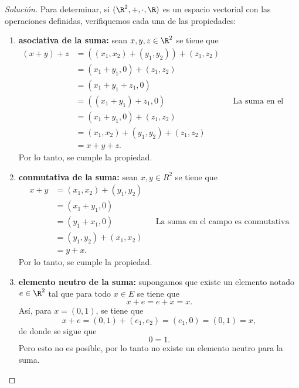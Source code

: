 \documentclass[a4,11pt]{aleph-notas}
\begin{document}
\begin{proof}[Solución]\hspace{0pt}
    Para determinar, si $(\R^2,+,\cdot,\R)$ es un espacio vectorial con las operaciones definidas, verifiquemos cada una de las propiedades:
    \begin{enumerate}
    \item \textbf{asociativa de la suma:}
        sean $x,y,z\in \R^2$ se tiene que
        \begin{align*}
             (x + y) + z & = ( (x_1,x_2)+(y_1,y_2)) + (z_1,z_2) \\
             & = (x_1+y_1,0) + (z_1,z_2) \\
             & = (x_1+y_1+z_1,0) \\
             & = ((x_1+y_1)+z_1,0) && \mbox{La suma en el campo es asociativa} \\
             & = (x_1+y_1,0) + (z_1,z_2) \\
             & = (x_1,x_2) + (y_1,y_2) + (z_1,z_2) \\
             & = x+y+z.
        \end{align*}
        Por lo tanto, se cumple la propiedad. 
    \item \textbf{conmutativa de la suma:}
        sean $x,y\in R^2$ se tiene que
        \begin{align*}
            x + y & = (x_1,x_2) + (y_1,y_2) \\
                & = (x_1 + y_1, 0 ) \\
                & = (y_1 + x_1, 0)  && \mbox{La suma en el campo es conmutativa}\\
                & = (y_1,y_2) + (x_1,x_2) \\
                & = y + x.
        \end{align*}
        Por lo tanto, se cumple la propiedad.
    \item \textbf{elemento neutro de la suma:}
    supongamos que existe un elemento notado $e\in\R^2$ tal que para todo $x\in E$ se tiene que 
    \[
        x + e = e + x = x.
    \]
    Así, para $x=(0,1)$, se tiene que 
    \[
        x + e = (0,1) + (e_1,e_2) = (e_1,0) = (0,1) = x,
    \]
    de donde se sigue que 
    \[
        0 = 1.
    \]
    Pero esto no es posible, por lo tanto no existe un elemento neutro para la suma.

\end{enumerate}
\end{proof}
\end{document}
